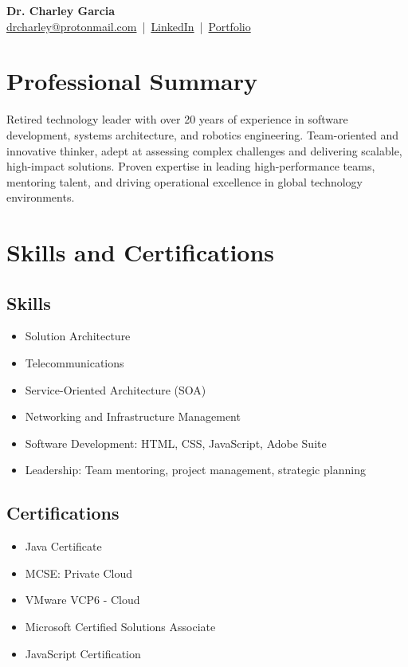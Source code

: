 \documentclass[a4paper,12pt]{article}
\begin{document}
\begin{center}
    {\LARGE \textbf{Dr. Charley Garcia}}\\[0.5em]
    \href{mailto:drcharley@protonmail.com}{drcharley@protonmail.com} \,|\,
    \href{https://www.linkedin.com/in/charliegarcia77/}{LinkedIn} \,|\,
    \href{https://codepen.io/RPhil86/full/ZYGMOmx}{Portfolio}
\end{center}

\section*{Professional Summary}
Retired technology leader with over 20 years of experience in software development, systems architecture, and robotics engineering. Team-oriented and innovative thinker, adept at assessing complex challenges and delivering scalable, high-impact solutions. Proven expertise in leading high-performance teams, mentoring talent, and driving operational excellence in global technology environments.

\section*{Skills and Certifications}
\subsection*{Skills}
\begin{itemize}[leftmargin=1.5em]
    \item Solution Architecture
    \item Telecommunications
    \item Service-Oriented Architecture (SOA)
    \item Networking and Infrastructure Management
    \item Software Development: HTML, CSS, JavaScript, Adobe Suite
    \item Leadership: Team mentoring, project management, strategic planning
\end{itemize}

\subsection*{Certifications}
\begin{itemize}[leftmargin=1.5em]
    \item Java Certificate
    \item MCSE: Private Cloud
    \item VMware VCP6 - Cloud
    \item Microsoft Certified Solutions Associate
    \item JavaScript Certification
\end{itemize}
\end{document}
